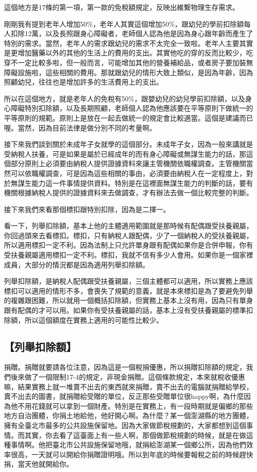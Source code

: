 \documentclass[]{ctexbook}
\begin{document}
這個地方是17條的第一項，第一款的免稅額規定，反映出維繫物理生存需求。

剛剛我有提到老年人增加50\%，老年人其實這個增加50\%，跟幼兒的學前扣除額每人扣除12萬，以及長照跟身心障礙者，老師個人認為他是因為身心跟年齡而產生了特別的需求。當然，老年人的需求跟幼兒的需求不太完全一致啦。老年人主要其實是更增加醫藥以外的其他的生活上的費用的支出。其實他吃的穿的反而比較少，吃穿不一定比較多啦，但一般而言，可能增加其他的營養補給品，或者房子要加裝無障礙設施啦，這些相關的費用。那就跟幼兒的情形大致上類似，是因為年齡，因為照顧幼兒，往往也是增加許多的生活費用上的支出。

所以在這個地方，就是老年人的免稅有50\%，跟嬰幼兒的幼兒學前扣除額，以及身心障礙特別扣除額，以及長期照顧，老師個人認為他應該要在平等原則下做統一的平等原則的規範。原則上是放在一起去做統一的規定會比較適當。這個是建議而已喔。當然，因為目前法律是做分別不同的考量啊。

接下來我們談到關於未成年子女就學的這個部分。未成年子女，因為一般來講就是受納稅人扶養，可是如果是屬於已經成年的而有身心障礙或無謀生能力的話，那這個部分原則上必須要由納稅人提供證據資料來讓主管機關依職權調查。主管機關當然可以依職權調查，可是因為這些相關的事由，必須要由納稅人在一定程度上，對於無謀生能力這一件事情提供資料。特別是在這裡面無謀生能力的判斷的話，要有機關根據納稅人提供的證據資料來去做調查，才有辦法去做一個比較完整的判斷。

接下來我們來看那個標扣跟特別扣除，因為是二擇一。

看一下，列舉扣除額，基本上他的主體適用範圍就是那時候有配偶跟受扶養親屬，你回過頭來去看標扣。標扣，只有納稅人跟配偶，少了一個納稅人的受扶養親屬，所以適用標扣一定不利。因為法制上只允許單身跟有配偶如果你是合併申報，你有受扶養親屬適用標扣一定不利。標扣，我就不信有多少人會用。如果你是一個家裡成員，大部分的情況都是因為適用列舉扣除額。

列舉扣除額，是納稅人配偶跟受扶養親屬，三個主體都可以適用，所以實務上應該標扣可以適用的情形不多，會喪失了規範的意義，就是本來標扣是為了要避免列舉的複雜跟困難，所以就用一個概括扣除額，但實務上基本上沒有用，因為只有單身跟有配偶的才可以用。如果你有受扶養親屬的話，基本上沒有受扶養親屬的標準扣除額，所以這個額度在實務上適用的可能性比較少。

\hypertarget{ux5217ux8209ux6263ux9664ux984d-1}{%
\subsection{【列舉扣除額】}\label{ux5217ux8209ux6263ux9664ux984d-1}}

捐贈。捐贈就要請各位注意，因為這是一個稅捐優惠，所以捐贈扣除額的規定，我們後來做了一個限制17-4的規定，非現金捐贈。這個條款規定，本來就稅收優惠嘛，結果實務上就一堆賣不出去的東西就來捐贈，賣不出去的電腦就捐贈給學校，賣不出去的圖書，就捐贈給受贈的單位，反正那些受贈單位很happy啊，為什麼因為他不用花錢就可以拿到一個財產。特別是在實務上，有一段時期就是偏鄉的那些地方自治團體，你捐土地給他，他好開心啊。為什麼？某一個澎湖縣的地方團體，擁有全臺北市最多的公共設施保留地。因為大家做節稅規劃的，大家都想到這個事情。而其實，你去看了這臺面上有一些人啊，那個做節稅規劃的時候，就是在做這種事情啊。他把臺北市公共設施保留地哦，就捐給澎湖某一個鄉公所，因為他們效率很高，一天就可以開給你捐贈證明哦。所以到年底的時候要報稅之前的時候趕快捐，當天他就開給你。
\end{document}
